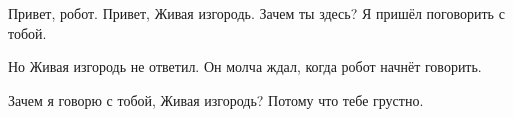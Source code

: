 \begin{dialog}
\X Привет, робот.
\R Привет, Живая изгородь.
\X Зачем ты здесь?
\R Я пришёл поговорить с тобой.
\end{dialog}

\begin{monolog}
Но Живая изгородь не ответил. Он молча ждал, когда робот начнёт говорить.
\end{monolog}

\begin{dialog}
\R Зачем я говорю с тобой, Живая изгородь?
\X Потому что тебе грустно.
\end{dialog}